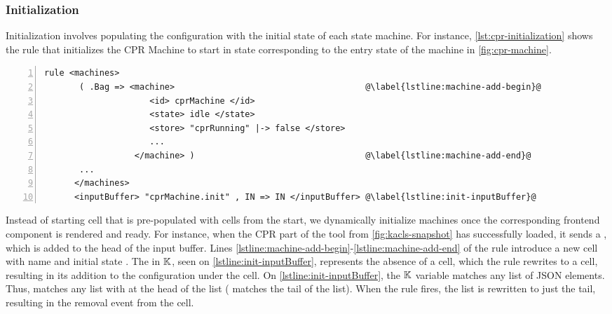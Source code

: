 \subsubsection{Initialization}

Initialization involves populating the configuration with the
initial state of each state machine. For instance,
\autoref{lst:cpr-initialization} shows the rule that initializes
the CPR Machine to start in state  corresponding to the
entry state of the machine in \autoref{fig:cpr-machine}.

\begin{lstlisting}[float=ht,
  frame=single,
  style=ksty,
  language=k,
  numbers=left,
  numbersep=5pt,
  caption={CPR Initialization},
  label={lst:cpr-initialization},
  xleftmargin=3ex
]
 rule <machines>
       ( .Bag => <machine>                                      @\label{lstline:machine-add-begin}@
                     <id> cprMachine </id>
                     <state> idle </state>
                     <store> "cprRunning" |-> false </store>
                     ...
                  </machine> )                                  @\label{lstline:machine-add-end}@
       ...
      </machines>
      <inputBuffer> "cprMachine.init" , IN => IN </inputBuffer> @\label{lstline:init-inputBuffer}@
\end{lstlisting}
Instead of starting  cell that is pre-populated with
 cells from the start, we dynamically initialize
machines once the corresponding frontend component is rendered and ready.
For instance, when the CPR part of the tool from
\autoref{fig:kacls-snapshot} has successfully loaded, it sends a ,
which is added to the head of the input buffer.
Lines \ref{lstline:machine-add-begin}-\ref{lstline:machine-add-end} of the rule
introduce a new  cell with name  and initial
state . The  in $\mathbb{K}$, seen on
\autoref{lstline:init-inputBuffer}, represents the absence of a cell, which
the rule rewrites to a  cell, resulting in its
addition to the configuration under the  cell.
On \autoref{lstline:init-inputBuffer}, the $\mathbb{K}$ variable  matches any list of
JSON elements. Thus,  matches any list with
 at the head of the list ( matches the tail of
the list). When the rule fires, the list is rewritten to
just the tail, resulting in the removal 
event from the  cell.

